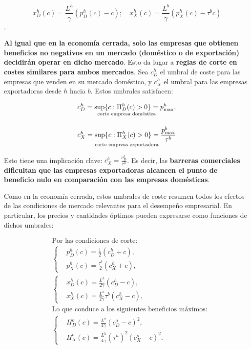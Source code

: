 \documentclass[10pt,a4paper]{article}
\begin{document}
$$x_D^h(c) = \frac{L^h}{\gamma} (p_D^h(c) - c); \quad x_X^h(c) = \frac{L^b}{\gamma} (p_X^h(c) - \tau^b c)$$.

\textbf{Al igual que en la economía cerrada, solo las empresas que obtienen beneficios no negativos en un mercado (doméstico o de exportación) decidirán operar en dicho mercado}. Esto da lugar a \textbf{reglas de corte en costes similares para ambos mercados}. Sea $c_D^h$ el umbral de coste para las empresas que venden en su mercado doméstico, y $c_X^h$ el umbral para las empresas exportadoras desde $h$ hacia $b$. Estos umbrales satisfacen:

$$\begin{aligned}
    &\underset{\text{\scriptsize corte empresa doméstica}}{c_D^h = \sup \{ c : \Pi_D^h(c) > 0 \} = p_{\max}^h,}\\[1em]
    &\underset{\text{\scriptsize corte empresa exportadora}}{c_X^h = \sup \{ c : \Pi_X^h(c) > 0 \} = \frac{p_{\max}^b}{\tau^b}}
\end{aligned}$$

Esto tiene una implicación clave: $c_X^b = \frac{c_D^h}{\tau^h}$. Es decir, las \textbf{barreras comerciales dificultan que las empresas exportadoras alcancen el punto de beneficio nulo en comparación con las empresas domésticas}. 

Como en la economía cerrada, estos umbrales de coste resumen todos los efectos de las condiciones de mercado relevantes para el desempeño empresarial. En particular, los precios y cantidades óptimos pueden expresarse como funciones de dichos umbrales:

$$\begin{aligned}
    &\text{Por las condiciones de corte}:\\[1em]
    &\left\{\begin{aligned}
        &p_D^h(c) = \frac{1}{2}(c_D^h + c),\\[1em]
        &p_X^h(c) = \frac{\tau^b}{2}(c_X^h + c),
    \end{aligned}\right.\\[3em]
    &\left\{\begin{aligned}
        &x_D^h(c) = \frac{L^h}{2\gamma}(c_D^h - c),\\[1em]
        &x_X^h(c) = \frac{L^b}{2\gamma}\tau^b (c_X^h - c),
    \end{aligned}\right.\\[3em]
    &\text{Lo que conduce a los siguientes beneficios máximos:}\\[1em]
    &\left\{\begin{aligned}
        &\Pi_D^o(c) = \frac{L^o}{4\gamma}(c_D^o - c)^2,\\[1em]
        &\Pi_X^o(c) = \frac{L^h}{4\gamma}\left(\tau^h\right)^2 (c_X^o - c)^2.
    \end{aligned}\right.
\end{aligned}$$
\end{document}
